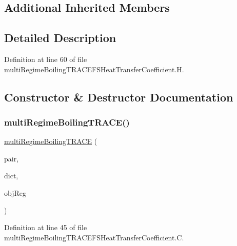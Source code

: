 \subsection*{Additional Inherited Members}


\subsection{Detailed Description}


Definition at line 60 of file multi\+Regime\+Boiling\+T\+R\+A\+C\+E\+F\+S\+Heat\+Transfer\+Coefficient.\+H.



\subsection{Constructor \& Destructor Documentation}
\mbox{\label{classFoam_1_1FSHeatTransferCoefficientModels_1_1multiRegimeBoilingTRACE_a372db76952778b907a91a0d231033262}} 
\subsubsection{\texorpdfstring{multi\+Regime\+Boiling\+T\+R\+A\+C\+E()}{multiRegimeBoilingTRACE()}}
{\footnotesize\ttfamily \hyperlink{classFoam_1_1FSHeatTransferCoefficientModels_1_1multiRegimeBoilingTRACE}{multi\+Regime\+Boiling\+T\+R\+A\+CE} (\begin{DoxyParamCaption}\item[{const \hyperlink{classFoam_1_1FSPair}{F\+S\+Pair} \&}]{pair,  }\item[{const dictionary \&}]{dict,  }\item[{const object\+Registry \&}]{obj\+Reg }\end{DoxyParamCaption})}



Definition at line 45 of file multi\+Regime\+Boiling\+T\+R\+A\+C\+E\+F\+S\+Heat\+Transfer\+Coefficient.\+C.



